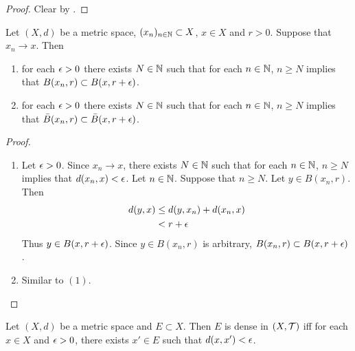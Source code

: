 \documentclass{book}
\begin{document}
\begin{proof}
	Clear by .
\end{proof}

\begin{ex} 
	Let $(X, d)$ be a metric space, $(x_n)_{n \in \mathbb{N}} \subset X$, $x \in X$ and $r > 0$. Suppose that $x_n \rightarrow x$. Then 
	\begin{enumerate}
		\item for each $\epsilon > 0$ there exists $N \in \mathbb{N}$ such that for each $n \in \mathbb{N}$, $n \geq N$ implies that $B(x_n, r) \subset B(x, r+\epsilon)$.
		\item for each $\epsilon > 0$ there exists $N \in \mathbb{N}$ such that for each $n \in \mathbb{N}$, $n \geq N$ implies that $\bar{B}(x_n, r) \subset \bar{B}(x, r+\epsilon)$.
	\end{enumerate} 
\end{ex}

\begin{proof}\
	\begin{enumerate}
		\item Let $\epsilon >0$. Since $x_n \rightarrow x$, there exists $N \in \mathbb{N}$ such that for each $n \in \mathbb{N}$, $n \geq N$ implies that $d(x_n, x) < \epsilon$. Let $n \in \mathbb{N}$. Suppose that $n \geq N$. Let $y \in B(x_n, r)$. Then 
		\begin{align*}
			d(y, x)
			& \leq d(y, x_n) + d(x_n, x) \\
			& < r + \epsilon \\
		\end{align*}
		Thus $y \in B(x, r+ \epsilon)$. Since $y \in B(x_n, r)$ is arbitrary, $B(x_n, r) \subset  B(x, r+ \epsilon)$.
		\item Similar to $(1)$. 
	\end{enumerate}
\end{proof}


\begin{ex} 
	Let $(X, d)$ be a metric space and $E \subset X$. Then $E$ is dense in $(X, \mathcal{T})$ iff for each $x \in X$ and $\epsilon > 0$, there exists $x' \in E$ such that $d(x, x')< \epsilon$. 
\end{ex}
\end{document}
